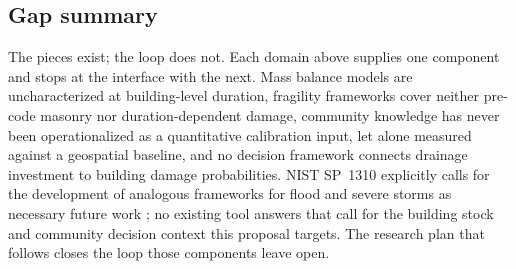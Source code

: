 \documentclass[11pt]{article}
\begin{document}
\subsection{Gap summary}
The pieces exist; the loop does not. Each domain above supplies one component and
stops at the interface with the next. Mass balance models are uncharacterized at
building-level duration, fragility frameworks cover neither pre-code masonry nor
duration-dependent damage, community knowledge has never been operationalized as a
quantitative calibration input, let alone measured against a geospatial baseline, and
no decision framework connects drainage investment to building damage probabilities.
NIST SP~1310 \cite{davis2024nist} explicitly calls for the development of analogous
frameworks for flood and severe storms as necessary future work
\cite[Sec.~6.1.2]{davis2024nist}; no existing tool answers that call for the
building stock and community decision context this proposal targets.
The research plan that follows closes the loop those components leave open.

\end{document}

